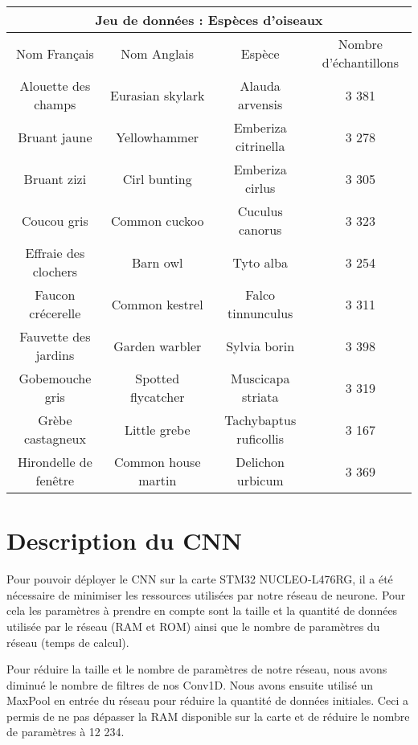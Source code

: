 \begin{center}
  \begin{tabular}{ |c|c|c|c| }
   \hline
   \multicolumn{4}{|c|}{Jeu de données : Espèces d'oiseaux} \\
   \hline
    Nom Français & Nom Anglais & Espèce & Nombre d'échantillons\\
   \hline
    Alouette des champs & Eurasian skylark & Alauda arvensis & 3 381\\
    Bruant jaune & Yellowhammer & Emberiza citrinella & 3 278\\
    Bruant zizi & Cirl bunting & Emberiza cirlus & 3 305\\
    Coucou gris & Common cuckoo & Cuculus canorus & 3 323\\
    Effraie des clochers & Barn owl & Tyto alba & 3 254\\
    Faucon crécerelle & Common kestrel & Falco tinnunculus & 3 311\\
    Fauvette des jardins & Garden warbler & Sylvia borin & 3 398\\
    Gobemouche gris & Spotted flycatcher & Muscicapa striata & 3 319\\
    Grèbe castagneux & Little grebe & Tachybaptus ruficollis & 3 167\\
    Hirondelle de fenêtre & Common house martin & Delichon urbicum & 3 369\\
   \hline
  \end{tabular}
\end{center}

\section{Description du CNN}

Pour pouvoir déployer le CNN sur la carte STM32 NUCLEO-L476RG, il a été nécessaire 
de minimiser les ressources utilisées par notre réseau de neurone. Pour cela les paramètres à prendre en compte sont
la taille et la quantité de données utilisée par le réseau (RAM et ROM) ainsi que le nombre 
de paramètres du réseau (temps de calcul).

Pour réduire la taille et le nombre de paramètres de notre réseau, nous avons diminué le nombre de filtres de nos
Conv1D. Nous avons ensuite utilisé un MaxPool en entrée du réseau pour réduire la quantité de données initiales. 
Ceci a permis de ne pas dépasser la RAM disponible sur la carte et de réduire le nombre de paramètres à 12 234.

